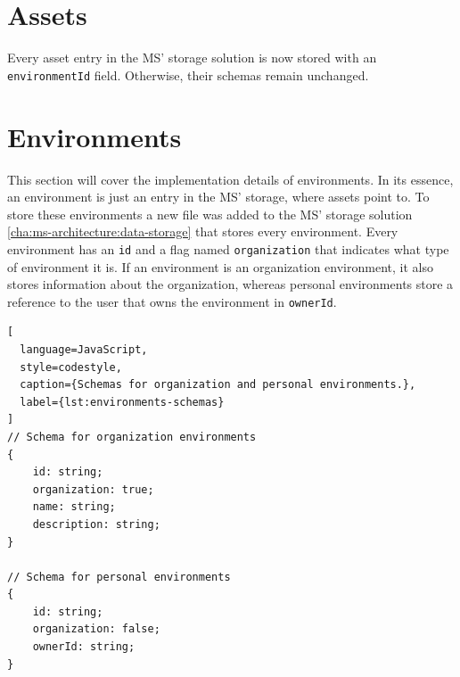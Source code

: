 %

\section{Assets}

Every asset entry in the MS' storage solution is now stored with an
\lstinline{environmentId} field.
Otherwise, their schemas remain unchanged.


\section{Environments}


This section will cover the implementation details of environments.
In its essence, an environment is just an entry in the MS' storage, where assets point to.
To store these environments a new file was added to the MS' storage solution
\ref{cha:ms-architecture:data-storage} that stores every environment.
Every environment has an \lstinline{id} and a flag named \lstinline{organization} that
indicates what type of environment it is.
If an environment is an organization environment, it also stores information about the
organization,
whereas personal environments store a reference to the user that owns the environment in
\lstinline{ownerId}.

\begin{lstlisting}[
  language=JavaScript,
  style=codestyle,
  caption={Schemas for organization and personal environments.},
  label={lst:environments-schemas}
]
// Schema for organization environments
{
    id: string;
    organization: true;
    name: string;
    description: string;
}

// Schema for personal environments
{
    id: string;
    organization: false;
    ownerId: string;
}
\end{lstlisting}

